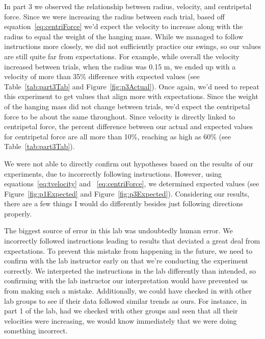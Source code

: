 In part 3 we observed the relationship between radius, velocity, and centripetal force. Since we were increasing the radius between each trial, based off equation~\ref{eq:centriForce} we'd expect the velocity to increase along with the radius to equal the weight of the hanging mass. While we managed to follow instructions more closely, we did not sufficiently practice our swings, so our values are still quite far from expectations. For example, while overall the velocity increased between trials, when the radius was 0.15 m, we ended up with a velocity of more than 35\% difference with expected values (see Table~\ref{tab:part3Tab} and Figure~\ref{fig:p3Actual}). Once again, we'd need to repeat this experiment to get values that align more with expectations. Since the weight of the hanging mass did not change between trials, we'd expect the centripetal force to be about the same throughout. Since velocity is directly linked to centripetal force, the percent difference between our actual and expected values for centripetal force are all more than 10\%, reaching as high as 60\% (see Table~\ref{tab:part3Tab}). 

We were not able to directly confirm out hypotheses based on the results of our experiments, due to incorrectly following instructions. However, using equations~\ref{eq:tvelocity} and ~\ref{eq:centriForce}, we determined expected values (see Figure~\ref{fig:p1Expected} and Figure~\ref{fig:p3Expected}). Considering our results, there are a few things I would do differently besides just following directions properly.

The biggest source of error in this lab was undoubtedly human error. We incorrectly followed instructions leading to results that deviated a great deal from expectations. To prevent this mistake from happening in the future, we need to confirm with the lab instructor early on that we're conducting the experiment correctly. We interpreted the instructions in the lab differently than intended, so confirming with the lab instructor our interpretation would have prevented us from making such a mistake. Additionally, we could have checked in with other lab groups to see if their data followed similar trends as ours. For instance, in part 1 of the lab, had we checked with other groups and seen that all their velocities were increasing, we would know immediately that we were doing something incorrect. 
